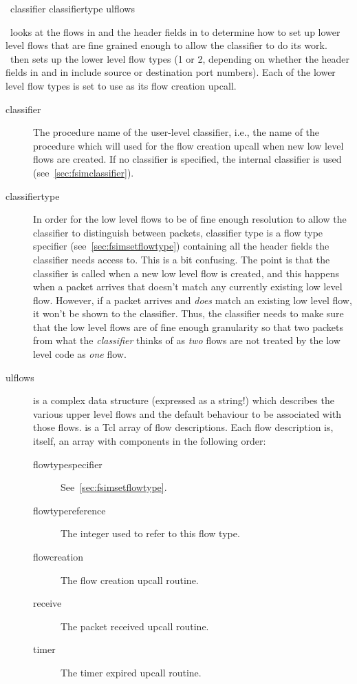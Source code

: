 \documentclass{article}
\begin{document}
\SEEALSO


\manend


\SYNOPSIS \cmdname\ classifier classifiertype ulflows

\DESCRIPTION

\cmdname\ looks at the flows in  and the header fields
in  to determine how to set up lower level flows
that are fine grained enough to allow the classifier to do its work.
\cmdname\ then sets up the lower level flow types (1 or 2, depending on
whether the header fields in  and in
 include source or destination port numbers).
Each of the lower level flow types is set to use  as
its flow creation upcall.

\begin{description}
\item[classifier] The procedure name of the user-level classifier,
i.e., the name of the procedure which will used for the flow creation
upcall when new low level flows are created.  If no classifier is
specified, the internal classifier  is used
(see~\ref{sec:fsimclassifier}).
\item[classifiertype] In order for the low level flows to be of fine
enough resolution to allow the classifier to distinguish between
packets, classifier type is a flow type specifier
(see~\ref{sec:fsimsetflowtype}) containing all the header fields the
classifier needs access to.  This is a bit confusing.  The point is
that the classifier is called when a new low level flow is created, and
this happens when a packet arrives that doesn't match any currently
existing low level flow.  However, if a packet arrives and \emph{does}
match an existing low level flow, it won't be shown to the classifier.
Thus, the classifier needs to make sure that the low level flows are
of fine enough granularity so that two packets from what the
\emph{classifier} thinks of as \emph{two} flows are not treated by the
low level code as \emph{one} flow.
\item[ulflows]   is a complex data structure (expressed
as a string!) which describes the various upper level flows and the
default behaviour to be associated with those flows.  
is a Tcl array of flow descriptions.  Each flow description is, itself,
an array with components in the following order:
\begin{description}
\item[flowtypespecifier] See~\ref{sec:fsimsetflowtype}.
\item[flowtypereference] The integer used to refer to this flow type.
\item[flowcreation] The flow creation upcall routine.
\item[receive] The packet received upcall routine.
\item[timer] The timer expired upcall routine.
\end{description}
\end{description}
\end{document}
